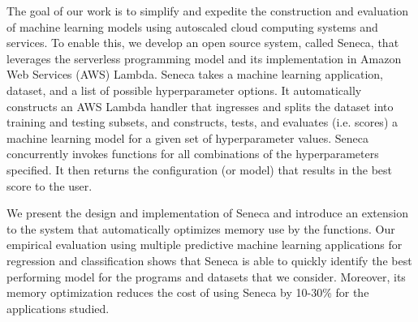 The goal of our work is to simplify and expedite the 
construction and evaluation of machine learning models 
using autoscaled cloud computing systems and services.
To enable this, we develop an open source system, called Seneca, that leverages
the serverless programming model and its implementation in Amazon Web Services
(AWS) Lambda.  
Seneca takes a machine learning application, dataset, and a list of 
possible hyperparameter options.  It automatically constructs an AWS Lambda
handler that ingresses and splits the dataset into training
and testing subsets, and constructs, tests, and evaluates (i.e. scores) a machine
learning model for a given set of hyperparameter values.  Seneca concurrently invokes
functions for all combinations of the hyperparameters specified.
It then returns the configuration (or model) that results in the best score 
to the user.  

We present the design and implementation of Seneca and introduce an extension to the
system that automatically optimizes memory use by the functions.  
Our empirical evaluation using multiple predictive machine learning applications 
for regression and classification shows that Seneca is able to quickly
identify the best performing model for the programs and datasets that we consider.
Moreover, its memory optimization reduces the cost of using Seneca 
by 10-30\% for the applications studied.

